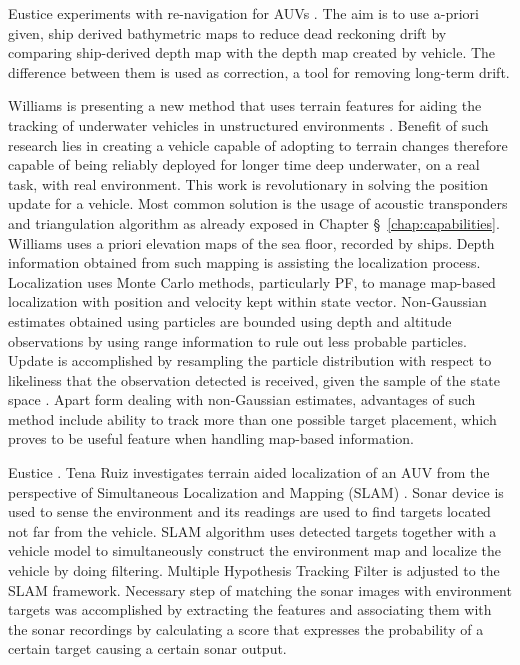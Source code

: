Eustice experiments with re-navigation for AUVs \cite{eustice05towards}. The aim is to use a-priori given, ship derived bathymetric maps to reduce dead reckoning drift by comparing ship-derived depth map with the depth map created by vehicle. The difference between them is used as correction, a tool for removing long-term drift. 

Williams is presenting a new method that uses terrain features for aiding the tracking of underwater vehicles in unstructured environments \cite{williams06}. Benefit of such research lies in creating a vehicle capable of adopting to terrain changes therefore capable of being reliably deployed for longer time deep underwater, on a real task, with real environment. This work is revolutionary in solving the position update for a vehicle. Most common solution is the usage of acoustic transponders and triangulation algorithm as already exposed in Chapter \S~\ref{chap:capabilities}. Williams uses a priori elevation maps of the sea floor, recorded by ships. Depth information obtained from such mapping is assisting the localization process. Localization uses Monte Carlo methods, particularly PF, to manage map-based localization with position and velocity kept within state vector. Non-Gaussian estimates obtained using particles are bounded using depth and altitude observations by using range information to rule out less probable particles. Update is accomplished by resampling the particle distribution with respect to likeliness that the observation detected is received, given the sample of the state space \cite{williams06}. Apart form dealing with non-Gaussian estimates, advantages of such method include ability to track more than one possible target placement, which proves to be useful feature when handling map-based information.  

Eustice \cite{eustice05exactly}.
Tena Ruiz investigates terrain aided localization of an AUV from the perspective of Simultaneous Localization and Mapping (SLAM) \cite{ruiz01}. Sonar device is used to sense the environment and its readings are used to find targets located not far from the vehicle. SLAM algorithm uses detected targets together with a vehicle model to simultaneously construct the environment map and localize the vehicle by doing filtering. Multiple Hypothesis Tracking Filter is adjusted to the SLAM framework. Necessary step of matching the sonar images with environment targets was accomplished by extracting the features and associating them with the sonar recordings by calculating a score that expresses the probability of a certain target causing a certain sonar output. 

